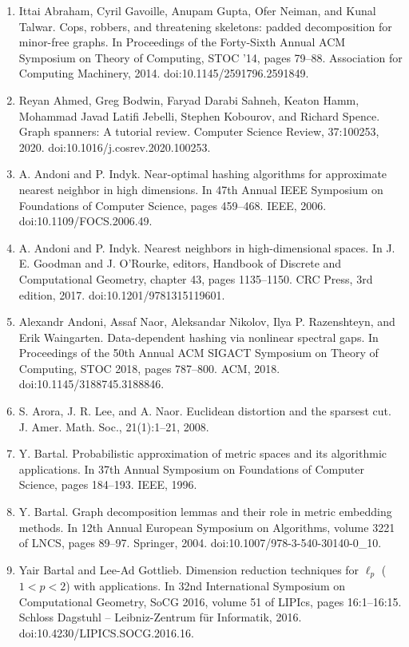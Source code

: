 \begin{enumerate}
\item  [1]  Ittai Abraham, Cyril Gavoille, Anupam Gupta, Ofer Neiman, and Kunal Talwar.  Cops, robbers, and threatening skeletons: padded decomposition for minor-free graphs.  In Proceedings of the Forty-Sixth Annual ACM Symposium on Theory of Computing, STOC ’14, pages 79–88. Association for Computing Machinery, 2014.  doi:10.1145/2591796.2591849.  
\item  [2]  Reyan Ahmed, Greg Bodwin, Faryad Darabi Sahneh, Keaton Hamm, Mohammad Javad Latifi Jebelli, Stephen Kobourov, and Richard Spence.  Graph spanners: A tutorial review.  Computer Science Review, 37:100253, 2020.  doi:10.1016/j.cosrev.2020.100253.  
\item  [3]  A. Andoni and P. Indyk.  Near-optimal hashing algorithms for approximate nearest neighbor in high dimensions.  In 47th Annual IEEE Symposium on Foundations of Computer Science, pages 459–468. IEEE, 2006.  doi:10.1109/FOCS.2006.49.  
\item  [4]  A. Andoni and P. Indyk.  Nearest neighbors in high-dimensional spaces.  In J. E. Goodman and J. O’Rourke, editors, Handbook of Discrete and Computational Geometry, chapter 43, pages 1135–1150. CRC Press, 3rd edition, 2017.  doi:10.1201/9781315119601.  
\item  [5]  Alexandr Andoni, Assaf Naor, Aleksandar Nikolov, Ilya P. Razenshteyn, and Erik Waingarten.  Data-dependent hashing via nonlinear spectral gaps.  In Proceedings of the 50th Annual ACM SIGACT Symposium on Theory of Computing, STOC 2018, pages 787–800. ACM, 2018.  doi:10.1145/3188745.3188846.  
\item  [6]  S. Arora, J. R. Lee, and A. Naor.  Euclidean distortion and the sparsest cut.  J. Amer. Math. Soc., 21(1):1–21, 2008.  
\item  [7]  Y. Bartal.  Probabilistic approximation of metric spaces and its algorithmic applications.  In 37th Annual Symposium on Foundations of Computer Science, pages 184–193. IEEE, 1996.  
\item  [8]  Y. Bartal.  Graph decomposition lemmas and their role in metric embedding methods.  In 12th Annual European Symposium on Algorithms, volume 3221 of LNCS, pages 89–97. Springer, 2004.  doi:10.1007/978-3-540-30140-0\_10.  
\item  [9]  Yair Bartal and Lee-Ad Gottlieb.  Dimension reduction techniques for $\ell_{p}$ ($1<p<2$) with applications.  In 32nd International Symposium on Computational Geometry, SoCG 2016, volume 51 of LIPIcs, pages 16:1–16:15. Schloss Dagstuhl – Leibniz-Zentrum für Informatik, 2016.  doi:10.4230/LIPICS.SOCG.2016.16.  

\end{enumerate}
